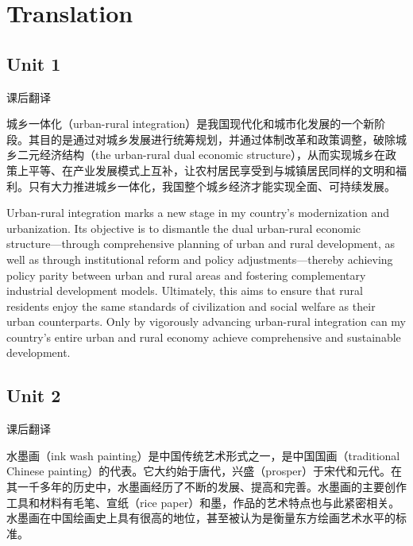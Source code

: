 \section{Translation}

\subsection{Unit 1}

\begin{question}{课后翻译}

城乡一体化（urban-rural integration）是我国现代化和城市化发展的一个新阶段。其目的是通过对城乡发展进行统筹规划，并通过体制改革和政策调整，破除城乡二元经济结构（the urban-rural dual economic structure），从而实现城乡在政策上平等、在产业发展模式上互补，让农村居民享受到与城镇居民同样的文明和福利。只有大力推进城乡一体化，我国整个城乡经济才能实现全面、可持续发展。
\end{question}

\begin{solution}

Urban-rural integration marks a new stage in my country's modernization and urbanization. Its objective is to dismantle the dual urban-rural economic structure—through comprehensive planning of urban and rural development, as well as through institutional reform and policy adjustments—thereby achieving policy parity between urban and rural areas and fostering complementary industrial development models. Ultimately, this aims to ensure that rural residents enjoy the same standards of civilization and social welfare as their urban counterparts. Only by vigorously advancing urban-rural integration can my country's entire urban and rural economy achieve comprehensive and sustainable development.
	
\end{solution}

\subsection{Unit 2}

\begin{question}{课后翻译}

水墨画（ink wash painting）是中国传统艺术形式之一，是中国国画（traditional Chinese painting）的代表。它大约始于唐代，兴盛（prosper）于宋代和元代。在其一千多年的历史中，水墨画经历了不断的发展、提高和完善。水墨画的主要创作工具和材料有毛笔、宣纸（rice paper）和墨，作品的艺术特点也与此紧密相关。水墨画在中国绘画史上具有很高的地位，甚至被认为是衡量东方绘画艺术水平的标准。
	
\end{question}


